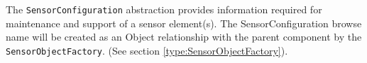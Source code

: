 The \texttt{SensorConfiguration} abstraction provides information required for maintenance and support of a sensor element(s).
The SensorConfiguration browse name will be created as an Object relationship with the parent component
by the \texttt{SensorObjectFactory}. (See section \ref{type:SensorObjectFactory}).
